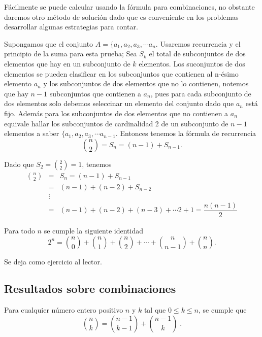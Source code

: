 \begin{solucion}
Fácilmente se puede calcular usando la fórmula para combinaciones, no obstante daremos otro método de solución dado que es conveniente en los problemas desarrollar algunas estrategias para contar.

Supongamos que el conjunto $A=\{a_1, a_2, a_3, \cdots a_n$. Usaremos recurrencia y el principio de la suma para esta prueba; Sea $S_k$ el total de subconjuntos de dos elementos que hay en un subconjunto de $k$ elementos. Los suconjuntos de dos elementos se pueden clasificar en los subconjuntos que contienen al n-ésimo elemento $a_n$ y los subconjuntos de dos elementos que no lo contienen, notemos que hay $n-1$ subconjuntos que contienen a $a_n$, pues para cada subconjunto de dos elementos solo debemos seleccinar un elemento del conjunto dado que $a_n$ está fijo. Además para los subconjuntos de dos elementos que no contienen a $a_n$ equivale hallar los subconjuntos de cardinalidad 2 de un subconjunto de $n-1$ elementos a saber $\{a_1, a_2, a_3, \cdots a_{n-1}$. Entonces tenemos la fórmula de recurrencia $$\displaystyle \binom{n}{2}=S_n = (n-1)+S_{n-1}.$$

Dado que $S_2=\displaystyle \binom{2}{2}=1$, tenemos 
\begin{eqnarray*}
\displaystyle \binom{n}{2} & = & S_n = (n-1)+S_{n-1}\\
& = & (n-1)+(n-2)+S_{n-2}\\
&\vdots & \\
& = & (n-1)+(n-2)+(n-3)+\cdots 2+1=\dfrac{n(n-1)}{2} 
\end{eqnarray*}
\end{solucion}

\begin{teorema}
    Para todo $n$ se cumple la siguiente identidad $$2^n=\binom{n}{0}+\binom{n}{1}+\binom{n}{2}+\cdots +\binom{n}{n-1}+\binom{n}{n}.$$
\end{teorema}
\begin{demostracion}
    Se deja como ejercicio al lector.
\end{demostracion}

\subsection{Resultados sobre combinaciones}
\begin{teorema}
Para cualquier número entero positivo \(n\) y \(k\) tal que \(0 \leq k \leq n\), se cumple que \[\displaystyle \binom{n}{k} = \binom{n-1}{k-1}+ \binom{n-1}{k}\;.\]
\end{teorema}

